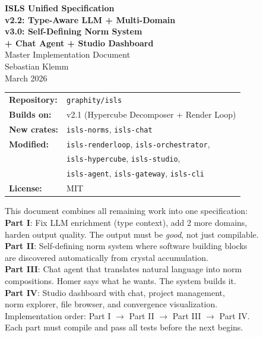 \documentclass[11pt,a4paper]{article}
\begin{document}
\begin{titlepage}
\begin{center}
\vspace*{1cm}
{\Huge\bfseries ISLS Unified Specification}\\[0.4cm]
{\LARGE\bfseries v2.2: Type-Aware LLM + Multi-Domain}\\[0.2cm]
{\LARGE\bfseries v3.0: Self-Defining Norm System}\\[0.2cm]
{\LARGE\bfseries + Chat Agent + Studio Dashboard}\\[1cm]
{\Large Master Implementation Document}\\[1.5cm]
{\large Sebastian Klemm}\\[0.3cm]
{\small March 2026}\\[1.5cm]

\begin{tabular}{ll}
\textbf{Repository:} & \texttt{graphity/isls} \\
\textbf{Builds on:} & v2.1 (Hypercube Decomposer + Render Loop) \\
\textbf{New crates:} & \texttt{isls-norms}, \texttt{isls-chat} \\
\textbf{Modified:} & \texttt{isls-renderloop}, \texttt{isls-orchestrator}, \\
 & \texttt{isls-hypercube}, \texttt{isls-studio}, \\
 & \texttt{isls-agent}, \texttt{isls-gateway}, \texttt{isls-cli} \\
\textbf{License:} & MIT \\
\end{tabular}

\vfill
{\small
This document combines all remaining work into one specification:\\[0.2cm]
\textbf{Part I}: Fix LLM enrichment (type context), add 2 more domains,\\
harden output quality. The output must be \emph{good}, not just compilable.\\[0.2cm]
\textbf{Part II}: Self-defining norm system where software building blocks\\
are discovered automatically from crystal accumulation.\\[0.2cm]
\textbf{Part III}: Chat agent that translates natural language into norm\\
compositions. Homer says what he wants. The system builds it.\\[0.2cm]
\textbf{Part IV}: Studio dashboard with chat, project management,\\
norm explorer, file browser, and convergence visualization.\\[0.4cm]
Implementation order: Part I $\to$ Part II $\to$ Part III $\to$ Part IV.\\
Each part must compile and pass all tests before the next begins.
}
\end{center}
\end{titlepage}
\end{document}
